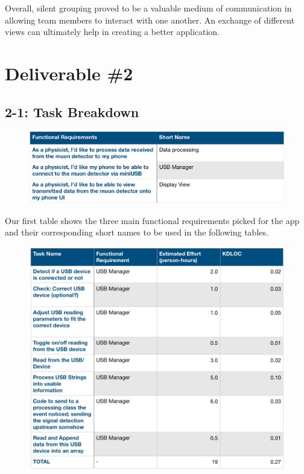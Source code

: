 \documentclass[11pt,a4paper]{article}
\begin{document}
Overall, silent grouping  proved to be a valuable medium of communication in allowing team members to interact with one another. An exchange of different views can ultimately help in creating a better application. 


\newpage
\section*{Deliverable \#2}

\subsection*{2-1: Task Breakdown}

\begin{figure}[h]
  \centering
      \includegraphics[width=1\textwidth]{table1.png}  
\end{figure}

Our first table shows the three main functional requirements picked for the app and their corresponding short names to be used in the following tables.

\begin{figure}[h]
  \centering
      \includegraphics[width=1.0\textwidth]{USBMtable3.png}  
\end{figure}
\end{document}
